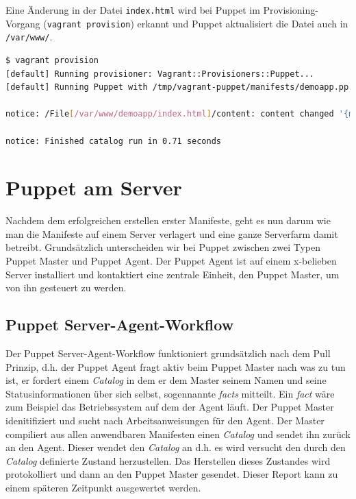 \documentclass[12pt,a4paper,ngerman]{article}
\begin{document}
Eine Änderung in der Datei \lstinline$index.html$ wird bei Puppet im Provisioning-Vorgang (\lstinline$vagrant provision$) erkannt und Puppet aktualisiert die Datei auch in \lstinline$/var/www/$.
\begin{lstlisting}[language=sh,caption=Puppet Provisioning nach Änderung von index.html, label=provisionapp]
$ vagrant provision
[default] Running provisioner: Vagrant::Provisioners::Puppet...
[default] Running Puppet with /tmp/vagrant-puppet/manifests/demoapp.pp...

notice: /File[/var/www/demoapp/index.html]/content: content changed '{md5}90a8d419b9c7b43b09ba73abebaf8f4c' to '{md5}0a4ee5bb63c3e5c29cc54cf36a4be23c'

notice: Finished catalog run in 0.71 seconds
\end{lstlisting}

\section{Puppet am Server}

Nachdem dem erfolgreichen erstellen erster Manifeste, geht es nun darum wie man die Manifeste auf einem Server verlagert und eine ganze Serverfarm damit betreibt. Grundsätzlich unterscheiden wir bei Puppet zwischen zwei Typen Puppet Master und Puppet Agent. Der Puppet Agent ist auf einem x-belieben Server installiert und kontaktiert eine zentrale Einheit, den Puppet Master, um von ihn gesteuert zu werden. 

\subsection{Puppet Server-Agent-Workflow}

Der Puppet Server-Agent-Workflow funktioniert grundsätzlich nach dem Pull Prinzip, d.h. der Puppet Agent fragt aktiv beim Puppet Master nach was zu tun ist, er fordert einem \textit{Catalog} in dem er dem Master seinem Namen und seine Statusinformationen über sich selbst, sogennannte \textit{facts} mitteilt. Ein \textit{fact} wäre zum Beispiel das Betriebssystem auf dem der Agent läuft. Der Puppet Master idenitifiziert und sucht nach Arbeitsanweisungen für den Agent. Der Master compiliert aus allen anwendbaren Manifesten einen \textit{Catalog} und sendet ihn zurück an den Agent. Dieser wendet den \textit{Catalog} an d.h. es wird versucht den durch den \textit{Catalog} definierte Zustand herzustellen. Das Herstellen dieses Zustandes wird protokolliert und dann an den Puppet Master gesendet. Dieser Report kann zu einem späteren Zeitpunkt ausgewertet werden.
\end{document}
